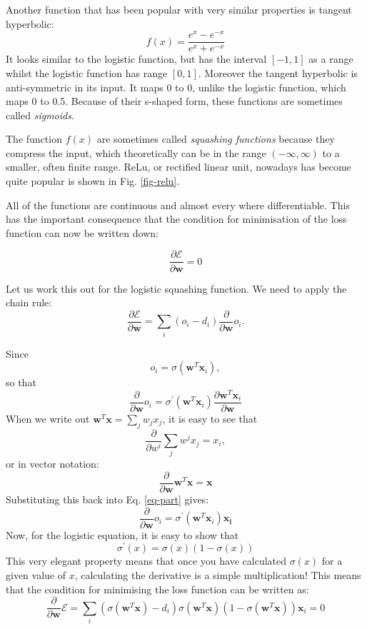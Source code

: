 Another function that has been popular with very
similar properties is tangent hyperbolic:
\begin{equation}
  f(x) = \frac{e^x - e^{-x}}{e^x + e^{-x}}
  \end{equation}
It looks similar to the logistic function, but has the interval $[-1, 1]$ as a range
whilst the logistic function has range $[0,1]$. Moreover the tangent hyperbolic
is anti-symmetric in its input. It maps 0 to 0, unlike the logistic function, which maps 0 to 0.5.
Because of their s-shaped form, these functions are sometimes called \emph{sigmoids}.

The function $f(x)$ are sometimes called \emph{squashing functions} because they compress the
input, which theoretically can be in the range $(-\infty,\infty)$ to a smaller, often finite
range. ReLu, or rectified linear unit, nowadays has become quite popular is shown
in Fig. \ref{fig-relu}.

All of the functions are continuous and almost every where differentiable. This has the important
consequence that the condition for minimisation of the loss function
can now be written down:

$$
\frac{\partial \mathcal{E}}{\partial \boldsymbol{w} } = 0
$$

Let us work this out for the logistic squashing function. We need to apply the chain rule:
\begin{equation}
  \frac{\partial \mathcal{E}}{\partial \boldsymbol{w}} = \sum_i (o_i - d_i) \frac{\partial}{\partial \boldsymbol{w}} o_i.
  \label{eq-part}
\end{equation}

Since
$$
o_i = \sigma(\boldsymbol{w}^T \boldsymbol{x}_i),
$$
so that
$$
\frac{\partial}{\partial \boldsymbol{w}} o_i = \sigma^{\prime}(\boldsymbol{w}^T \boldsymbol{x}_i) \frac{\partial \boldsymbol{w}^T \boldsymbol{x}_i}{\partial \boldsymbol{w}}
$$
When we write out $\boldsymbol{w}^T \boldsymbol{x} = \sum_j w_jx_j$, it is easy to see that
$$
\frac{\partial}{\partial w^i} \sum_j w^jx_j = x_i,
$$
or in vector notation:
$$
\frac{\partial}{\partial \boldsymbol{w}} \boldsymbol{w}^T \boldsymbol{x} = \boldsymbol{x} 
$$
Substituting this back into Eq. \ref{eq-part} gives:
$$
\frac{\partial}{\partial \boldsymbol{w}} o_i = \sigma^{\prime}(\boldsymbol{w}^T \boldsymbol{x}_i) \boldsymbol{x_i}
$$
Now, for the logistic equation, it is easy to show that
\begin{equation}
  \sigma^{\prime}(x)= \sigma(x)(1 - \sigma(x))
  \label{eq-prime}
\end{equation}
This very elegant property means that once you have calculated $\sigma(x)$ for a given value of $x$, calculating the derivative is
a simple multiplication! This means that the condition for minimising the loss function can be written as:
$$
\frac{\partial}{\partial \boldsymbol{w}} \mathcal{E} = \sum_i (\sigma(\boldsymbol{w}^T \boldsymbol{x}) - d_i)\sigma(\boldsymbol{w}^T \boldsymbol{x})( 1- \sigma( \boldsymbol{w}^T \boldsymbol{x} )) \boldsymbol{x}_i = 0
$$

